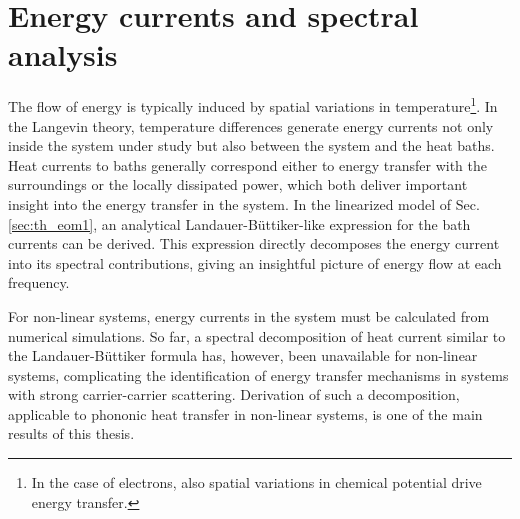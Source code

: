 \section{Energy currents and spectral analysis}
\label{sec:th_currents}

The flow of energy is typically induced by spatial variations in temperature\footnote{In the case of electrons, also spatial variations in chemical potential drive energy transfer.}. In the Langevin theory, temperature differences generate energy currents not only inside the system under study but also between the system and the heat baths. Heat currents to baths generally correspond either to energy transfer with the surroundings or the locally dissipated power, which both deliver important insight into the energy transfer in the system. In the linearized model of Sec. \ref{sec:th_eom1}, an analytical Landauer-B\"uttiker-like expression for the bath currents can be derived. This expression directly decomposes the energy current into its spectral contributions, giving an insightful picture of energy flow at each frequency.

For non-linear systems, energy currents in the system must be calculated from numerical simulations. So far, a spectral decomposition of heat current similar to the Landauer-B\"uttiker formula has, however, been unavailable for non-linear systems, complicating the identification of energy transfer mechanisms in systems with strong carrier-carrier scattering. Derivation of such a decomposition, applicable to phononic heat transfer in non-linear systems, is one of the main results of this thesis.

